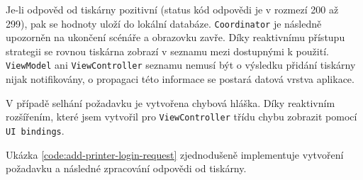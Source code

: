Je-li odpověd od tiskárny pozitivní (status kód odpovědi je v rozmezí 200 až 299), pak se hodnoty uloží do lokální databáze.
\texttt{Coordinator} je následně upozorněn na ukončení scénáře a obrazovku zavře.
Díky reaktivnímu přístupu strategii se rovnou tiskárna zobrazí v seznamu mezi dostupnými k použití.
\texttt{ViewModel} ani \texttt{ViewController} seznamu nemusí být o výsledku přidání tiskárny nijak notifikovány, o propagaci této informace se postará datová vrstva aplikace.

V případě selhání požadavku je vytvořena chybová hláška.
Díky reaktivním rozšířením, které jsem vytvořil pro \texttt{ViewController} třídu chybu zobrazit pomocí \texttt{UI bindings}.

Ukázka \ref{code:add-printer-login-request} zjednodušeně implementuje vytvoření požadavku a následné zpracování odpovědi od tiskárny.


